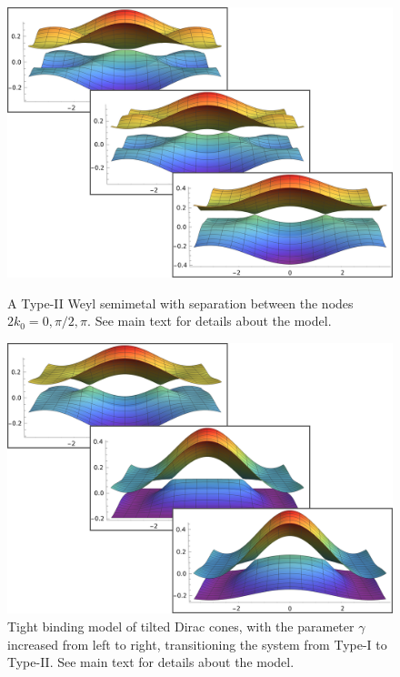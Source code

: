 \begin{figure}[htb]
  \centering
  \begin{subcaptionblock}[t]{0.49\textwidth}
    \includegraphics[width=\textwidth]{figures/typeIImoveTransition}
    \caption{\label{fig:typeii:move-nodes} A Type-II Weyl semimetal with separation between the nodes \(2k_{0} = 0, \pi/2, \pi \).
      See main text for details about the model.}
  \end{subcaptionblock}
  \begin{subcaptionblock}[t]{0.49\textwidth}
    \centering
    \includegraphics[width=\textwidth]{figures/bendingTransition.png}
    \caption{\label{fig:typeii:bendbands}Tight binding model of tilted Dirac cones, with the parameter \( \gamma \) increased from left to right, transitioning the system from Type-I to Type-II. See main text for details about the model.}
  \end{subcaptionblock}
\end{figure}

